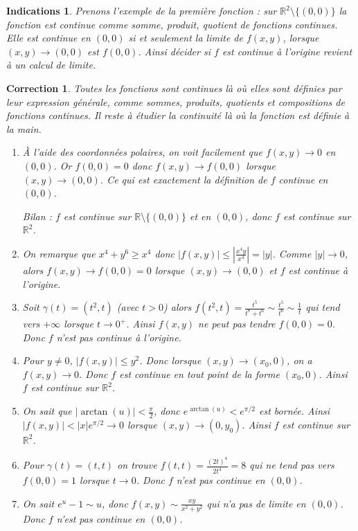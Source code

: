 \documentclass[11pt,a4paper]{article}
\newcommand{\Rr}{\mathbb{R}} \newcommand{\R}{\mathbb{R}}
\renewcommand{\ge}{\geqslant} \renewcommand{\geq}{\geqslant}
\renewcommand{\le}{\leqslant} \renewcommand{\leq}{\leqslant}
\theoremstyle{exostyle}
\newtheorem{ind}{Indications}
\newtheorem{cor}{Correction}
\newcommand{\indication}{\begin{ind}} \newcommand{\finindication}{\end{ind}}
\newcommand{\correction}{\begin{cor}} \newcommand{\fincorrection}{\end{cor}}
\begin{document}
\indication
Prenons l'exemple de la première fonction : sur $\Rr^2 \setminus \{ (0,0) \}$ la fonction est continue comme somme, produit, quotient de fonctions continues.
Elle est continue en $(0,0)$ si et seulement la limite de $f(x,y)$, lorsque $(x,y) \to (0,0)$ est $f(0,0)$. Ainsi décider si $f$ est continue à l'origine revient à un calcul de limite.
\finindication


\correction
Toutes les fonctions sont continues là où elles sont définies par leur expression générale, comme  sommes, produits, quotients et compositions de fonctions continues. Il reste à étudier la continuité là où la fonction est définie \og{}à la main\fg{}.

\begin{enumerate}	
	\item À l'aide des coordonnées polaires, on voit facilement que $f(x,y) \to 0$ en $(0,0)$.
	Or $f(0,0)=0$ donc $f(x,y) \to f(0,0)$ lorsque $(x,y) \to (0,0)$. Ce qui est exactement la définition de $f$ continue en $(0,0)$.
	
	Bilan : $f$ est continue sur $\Rr \setminus \{ (0,0) \}$ et en $(0,0)$, donc $f$ est continue sur $\Rr^2$.
	
	\item On remarque que $x^4+y^6 \ge x^4$ donc $|f(x,y)| \le \left| \frac{x^4y}{x^4} \right| = |y|$. Comme $|y| \to 0$, alors $f(x,y) \to f(0,0)=0$ lorsque $(x,y) \to (0,0)$ et $f$ est continue à l'origine.
		
	\item Soit $\gamma(t) = (t^2,t)$ (avec $t>0$) alors $f(t^2,t) = \frac{t^5}{t^8+t^6} \sim \frac{t^5}{t^6} \sim \frac{1}{t}$ qui tend vers $+\infty$ lorsque $t\to 0^+$. Ainsi $f(x,y)$ ne peut pas tendre $f(0,0)=0$. Donc $f$ n'est pas continue à l'origine.
	
	\item Pour $y\neq 0$, $| f(x,y) | \le y^2$. Donc lorsque $(x,y) \to (x_0,0)$, on a $f(x,y) \to 0$. Donc $f$ est continue en tout point de la forme $(x_0,0)$. Ainsi $f$ est continue sur $\Rr^2$.
	
	\item On sait que $| \arctan(u) | < \frac\pi2$, donc $e^{\arctan(u)} < e^{\pi/2}$ est bornée.
	Ainsi $|f(x,y)| < |x| e^{\pi/2} \to 0$ lorsque $(x,y) \to (0,y_0)$. Ainsi $f$ est continue sur $\Rr^2$.
	
	\item Pour $\gamma(t) = (t,t)$ on trouve $f(t,t) = \frac{ (2t)^4}{2t^4} = 8$ qui ne tend pas vers $f(0,0)=1$ lorsque $t \to0$. Donc $f$ n'est pas continue en $(0,0)$.
	
	\item On sait $e^u-1 \sim u$, donc $f(x,y) \sim \frac{xy}{x^2+y^2}$ qui n'a pas de limite en $(0,0)$. Donc $f$ n'est pas continue en $(0,0)$.	
	
		
\end{enumerate}
\fincorrection
\end{document}
